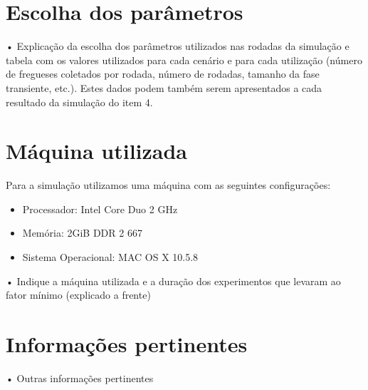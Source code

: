 \section{Escolha dos parâmetros}
• Explicação da escolha dos parâmetros utilizados nas rodadas da simulação e tabela com
os valores utilizados para cada cenário e para cada utilização (número de fregueses
coletados por rodada, número de rodadas, tamanho da fase transiente, etc.). Estes dados
podem também serem apresentados a cada resultado da simulação do item 4.

\section{Máquina utilizada}
Para a simulação utilizamos uma máquina com as seguintes configurações:
\begin{itemize}
  \item Processador: Intel Core Duo 2 GHz 
  \item Memória: 2GiB DDR 2 667
  \item Sistema Operacional: MAC OS X 10.5.8
\end{itemize}

• Indique a máquina utilizada e a duração dos experimentos que levaram ao fator mínimo
(explicado a frente)

\section{Informações pertinentes}
• Outras informações pertinentes
